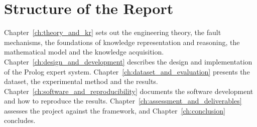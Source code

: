 \section{Structure of the Report}
\label{sec:structure-report}

Chapter~\ref{ch:theory_and_kr} sets out the engineering theory, the fault mechanisms, the foundations of knowledge representation and reasoning, the mathematical model and the knowledge acquisition. Chapter~\ref{ch:design_and_development} describes the design and implementation of the Prolog expert system. Chapter~\ref{ch:dataset_and_evaluation} presents the dataset, the experimental method and the results. Chapter~\ref{ch:software_and_reproducibility} documents the software development and how to reproduce the results. Chapter~\ref{ch:assessment_and_deliverables} assesses the project against the framework, and Chapter~\ref{ch:conclusion} concludes.
